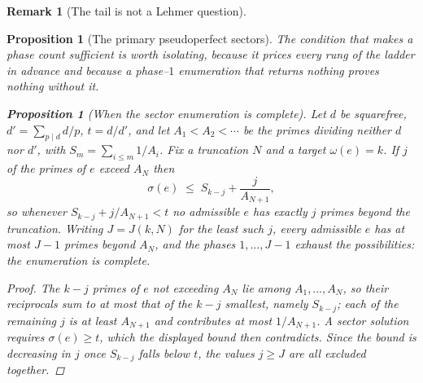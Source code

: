\documentclass[11pt]{article}
\newtheorem{proposition}[theorem]{Proposition}
\theoremstyle{definition}
\newtheorem{remark}[theorem]{Remark}
\begin{document}
\begin{remark}[The tail is not a Lehmer question]
\begin{proposition}[The primary pseudoperfect sectors]
The condition that makes a phase count sufficient is worth isolating, because it prices every rung of
the ladder in advance and because a phase--$1$ enumeration that returns nothing proves nothing without
it.

\begin{proposition}[When the sector enumeration is complete]\label{prop:phasecount}
Let $d$ be squarefree, $d'=\sum_{p\mid d}d/p$, $t=d/d'$, and let $A_1<A_2<\cdots$ be the primes
dividing neither $d$ nor $d'$, with $S_m=\sum_{i\le m}1/A_i$. Fix a truncation $N$ and a target
$\omega(e)=k$. If $j$ of the primes of $e$ exceed $A_N$ then
\[ \sigma(e)\;\le\;S_{k-j}+\frac{j}{A_{N+1}}, \]
so whenever $S_{k-j}+j/A_{N+1}<t$ no admissible $e$ has exactly $j$ primes beyond the truncation.
Writing $J=J(k,N)$ for the least such $j$, every admissible $e$ has at most $J-1$ primes beyond
$A_N$, and the phases $1,\dots,J-1$ exhaust the possibilities: the enumeration is complete.
\end{proposition}
\begin{proof}
The $k-j$ primes of $e$ not exceeding $A_N$ lie among $A_1,\dots,A_N$, so their reciprocals sum to at
most that of the $k-j$ smallest, namely $S_{k-j}$; each of the remaining $j$ is at least $A_{N+1}$
and contributes at most $1/A_{N+1}$. A sector solution requires $\sigma(e)\ge t$, which the displayed
bound then contradicts. Since the bound is decreasing in $j$ once $S_{k-j}$ falls below $t$, the
values $j\ge J$ are all excluded together.
\end{proof}


\end{proposition}
\end{remark}
\end{document}
